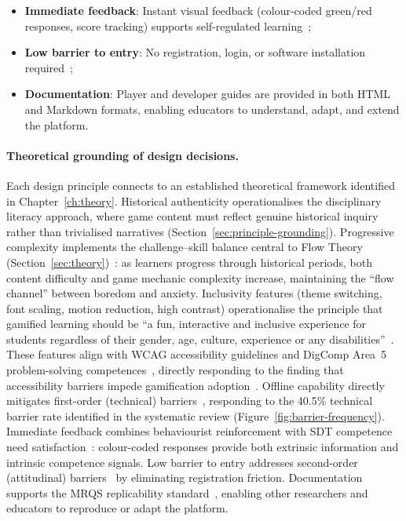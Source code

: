 \begin{itemize}
\item \textbf{Immediate feedback}: Instant visual feedback (colour-coded green/red responses, score tracking) supports self-regulated learning~\cite{Hattie2009, Connolly2012};
\item \textbf{Low barrier to entry}: No registration, login, or software installation required~\cite{Prensky2001};
\item \textbf{Documentation}: Player and developer guides are provided in both HTML and Markdown formats, enabling educators to understand, adapt, and extend the platform.
\end{itemize}

\paragraph{Theoretical grounding of design decisions.}
Each design principle connects to an established theoretical framework identified in Chapter~\ref{ch:theory}. Historical authenticity operationalises the disciplinary literacy approach, where game content must reflect genuine historical inquiry rather than trivialised narratives (Section~\ref{sec:principle-grounding}). Progressive complexity implements the challenge--skill balance central to Flow Theory (Section~\ref{sec:theory})~\cite{Csikszentmihalyi1990}: as learners progress through historical periods, both content difficulty and game mechanic complexity increase, maintaining the ``flow channel'' between boredom and anxiety. Inclusivity features (theme switching, font scaling, motion reduction, high contrast) operationalise the principle that gamified learning should be ``a fun, interactive and inclusive experience for students regardless of their gender, age, culture, experience or any disabilities''~\cite{McCrindle2013}. These features align with WCAG accessibility guidelines and DigComp Area~5 problem-solving competences~\cite{Vuorikari2016}, directly responding to the finding that accessibility barriers impede gamification adoption~\cite{Sunkara2024203, Gasca-Hurtado2021382}. Offline capability directly mitigates first-order (technical) barriers~\cite{Ertmer1999}, responding to the 40.5\% technical barrier rate identified in the systematic review (Figure~\ref{fig:barrier-frequency}). Immediate feedback combines behaviourist reinforcement with SDT competence need satisfaction~\cite{RyanDeci2000, Hattie2009}: colour-coded responses provide both extrinsic information and intrinsic competence signals. Low barrier to entry addresses second-order (attitudinal) barriers~\cite{Ertmer1999} by eliminating registration friction. Documentation supports the MRQS replicability standard~\cite{Korniienko2025mrqs}, enabling other researchers and educators to reproduce or adapt the platform.

